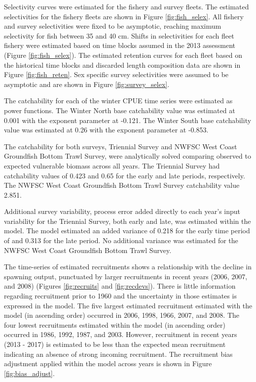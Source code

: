 \documentclass[12pt,]{article}
\begin{document}
Selectivity curves were estimated for the fishery and survey fleets. The
estimated selectivities for the fishery fleets are shown in Figure
\ref{fig:fish_selex}. All fishery and survey selectivities were fixed to
be asymptotic, reaching maximum selectivity for fish between 35 and 40
cm. Shifts in selectivities for each fleet fishery were estimated based
on time blocks assumed in the 2013 assessment (Figure
\ref{fig:fish_selex}). The estimated retention curves for each fleet
based on the historical time blocks and discarded length composition
data are shown in Figure \ref{fig:fish_reten}. Sex specific survey
selectivities were assumed to be asymptotic and are shown in Figure
\ref{fig:survey_selex}.

The catchability for each of the winter CPUE time series were estimated
as power functions. The Winter North base catchability value was
estimated at 0.001 with the exponent parameter at -0.121. The Winter
South base catchability value was estimated at 0.26 with the exponent
parameter at -0.853.

The catchability for both surveys, Triennial Survey and NWFSC West Coast
Groundfish Bottom Trawl Survey, were analytically solved comparing
observed to expected vulnerable biomass across all years. The Triennial
Survey had catchability values of 0.423 and 0.65 for the early and late
periods, respectively. The NWFSC West Coast Groundfish Bottom Trawl
Survey catchability value 2.851.

Additional survey variability, process error added directly to each
year's input variability for the Triennial Survey, both early and late,
was estimated within the model. The model estimated an added variance of
0.218 for the early time period of and 0.313 for the late period. No
additional variance was estimated for the NWFSC West Coast Groundfish
Bottom Trawl Survey.

The time-series of estimated recruitments shows a relationship with the
decline in spawning output, punctuated by larger recruitments in recent
years (2006, 2007, and 2008) (Figures \ref{fig:recruits} and
\ref{fig:recdevs}). There is little information regarding recruitment
prior to 1960 and the uncertainty in those estimates is expressed in the
model. The five largest estimated recruitment estimated with the model
(in ascending order) occurred in 2006, 1998, 1966, 2007, and 2008. The
four lowest recruitments estimated within the model (in ascending order)
occurred in 1986, 1992, 1987, and 2003. However, recruitment in recent
years (2013 - 2017) is estimated to be less than the expected mean
recruitment indicating an absence of strong incoming recruitment. The
recruitment bias adjustment applied within the model across years is
shown in Figure \ref{fig:bias_adjust}.
\end{document}

